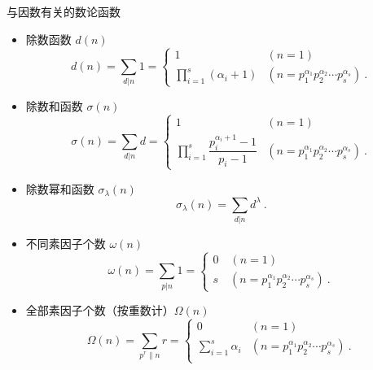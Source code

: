 \begin{example}{与因数有关的数论函数}
\begin{itemize}
\item 除数函数 $d(n)$
\begin{equation}
d(n)=\sum_{d|n} 1=
\begin{cases}
1&(n=1)\\
\prod\limits_{i=1}^{s}(\alpha_i+1)&(n=p_1^{\alpha_1}p_2^{\alpha_2}\cdots p_s^{\alpha_s})~.
\end{cases}
\end{equation}
\item 除数和函数 $\sigma(n)$
\begin{equation}
\sigma(n)=\sum_{d|n}d=
\begin{cases}
1&(n=1)\\
\prod\limits_{i=1}^{s}\dfrac{p_i^{\alpha_i+1}-1}{p_i-1}&(n=p_1^{\alpha_1}p_2^{\alpha_2}\cdots p_s^{\alpha_s})~.
\end{cases}
\end{equation}
\item 除数幂和函数 $\sigma_\lambda(n)$
\begin{equation}
\sigma_\lambda(n)=\sum_{d|n}d^\lambda~.
\end{equation}
\item 不同素因子个数 $\omega(n)$
\begin{equation}
\omega(n)=\sum_{p|n}1=
\begin{cases}
0\quad (n=1)\\
s\quad(n=p_1^{\alpha_1}p_2^{\alpha_2}\cdots p_s^{\alpha_s})~.
\end{cases}
\end{equation}
\item 全部素因子个数（按重数计）$\Omega(n)$
\begin{equation}
\Omega(n)=\sum_{p^r\|n}r=
\begin{cases}
0&(n=1)\\
\sum\limits_{i=1}^{s}\alpha_i&(n=p_1^{\alpha_1}p_2^{\alpha_2}\cdots p_s^{\alpha_s})~.\\
\end{cases}
\end{equation}
\end{itemize}
\end{example}
